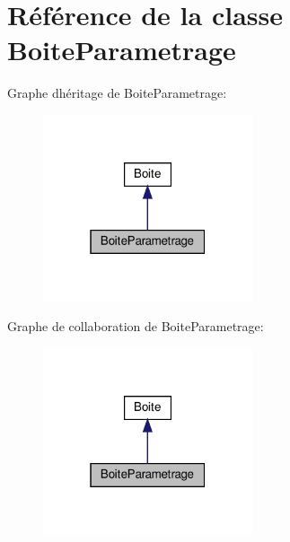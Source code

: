 \hypertarget{class_boite_parametrage}{}\section{Référence de la classe Boite\+Parametrage}
\label{class_boite_parametrage}


Graphe d\textquotesingle{}héritage de Boite\+Parametrage\+:\nopagebreak
\begin{figure}[H]
\begin{center}
\leavevmode
\includegraphics[width=175pt]{class_boite_parametrage__inherit__graph}
\end{center}
\end{figure}


Graphe de collaboration de Boite\+Parametrage\+:\nopagebreak
\begin{figure}[H]
\begin{center}
\leavevmode
\includegraphics[width=175pt]{class_boite_parametrage__coll__graph}
\end{center}
\end{figure}
